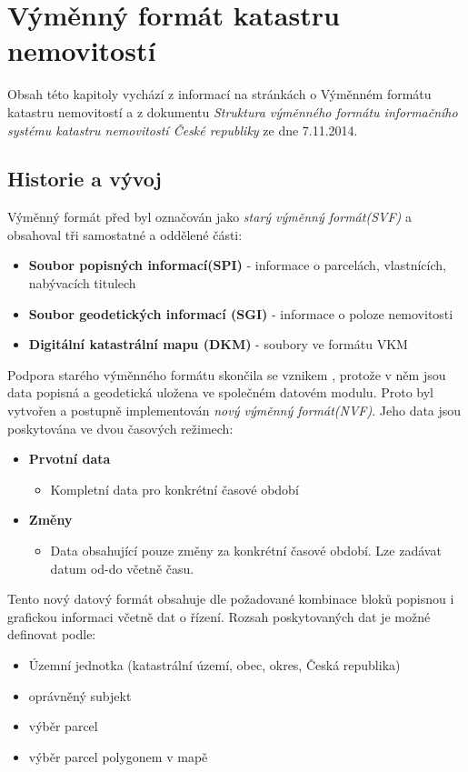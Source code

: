 \section{Výměnný formát katastru nemovitostí}
Obsah této kapitoly vychází z informací na stránkách  o Výměnném formátu katastru nemovitostí a z dokumentu \textit{Struktura výměnného formátu informačního systému katastru nemovitostí České republiky} ze dne 7.11.2014.\cite{struktura_ISKN}
\subsection{Historie a vývoj}
Výměnný formát před  byl označován jako \textit{starý výměnný formát(SVF)} a obsahoval tři samostatné a oddělené části:
\begin{itemize}
	\item \textbf{Soubor popisných informací(SPI)} - informace o parcelách, vlastnících, nabývacích titulech
	\item \textbf{Soubor geodetických informací (SGI)} - informace o poloze nemovitosti
	\item \textbf{Digitální katastrální mapu (DKM)} - soubory ve formátu VKM
\end{itemize}
Podpora starého výměnného formátu skončila se vznikem , protože v něm jsou data popisná a geodetická uložena ve společném datovém modulu. Proto byl vytvořen a postupně implementován \textit{nový výměnný formát(NVF)}. Jeho data jsou poskytována ve dvou časových režimech:
\begin{itemize}
\item \textbf{Prvotní data}\begin{itemize}
								\item Kompletní data pro konkrétní časové období
						   \end{itemize}

\item \textbf{Změny} \begin{itemize}
								\item Data obsahující pouze změny za konkrétní časové období. Lze zadávat datum od-do včetně času.
							\end{itemize}
\end{itemize}
Tento nový datový formát obsahuje dle požadované kombinace bloků popisnou i grafickou informaci včetně dat o řízení. Rozsah poskytovaných dat je možné definovat podle:
\begin{itemize}
		\item Územní jednotka (katastrální území, obec, okres, Česká republika)
		\item oprávněný subjekt
		\item výběr parcel
		\item výběr parcel polygonem v mapě
\end{itemize}
